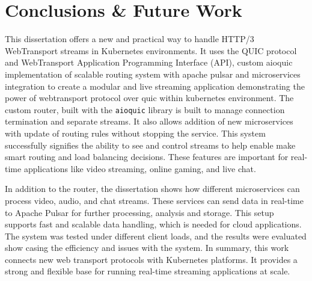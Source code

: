 






\chapter{Conclusions \& Future Work}
\label{chap:Conclusions}

This dissertation offers a new and practical way to handle HTTP/3 WebTransport streams in Kubernetes environments. It uses the QUIC protocol and WebTransport Application Programming Interface (API), custom aioquic implementation of scalable routing system with apache pulsar and microservices integration to create a modular and live streaming application demonstrating the power of webtransport protocol over quic within kubernetes environment. The custom router, built with the \texttt{aioquic} library is built to manage connection termination and separate streams. It also allows addition of new microservices with update  of routing rules without stopping the service. This system successfully signifies the ability to see and control streams to help enable make smart routing and load balancing decisions. These features are important for real-time applications like video streaming, online gaming, and live chat.

In addition to the router, the dissertation shows how different microservices can process video, audio, and chat streams. These services can send data in real-time to Apache Pulsar for further processing, analysis and storage. This setup supports fast and scalable data handling, which is needed for cloud applications. The system was tested under different client loads, and the results were evaluated show casing the efficiency and issues with the system. In summary, this work connects new web transport protocols with Kubernetes platforms. It provides a strong and flexible base for running real-time streaming applications at scale.


